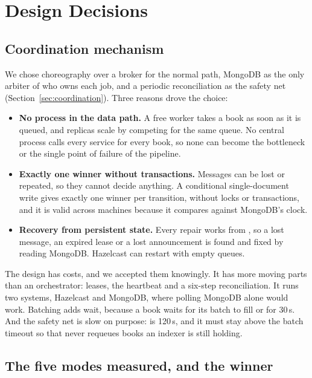 \section{Design Decisions}
\label{sec:decisions}

\subsection{Coordination mechanism}

We chose choreography over a broker for the normal path, MongoDB as the only arbiter of who owns each job, and a
periodic reconciliation as the safety net (Section~\ref{sec:coordination}). Three reasons drove the choice:
\begin{itemize}
\item \textbf{No process in the data path.} A free worker takes a book as soon as it is queued, and replicas scale by
  competing for the same queue. No central process calls every service for every book, so none can become the
  bottleneck or the single point of failure of the pipeline.
\item \textbf{Exactly one winner without transactions.} Messages can be lost or repeated, so they cannot decide
  anything. A conditional single-document write gives exactly one winner per transition, without locks or
  transactions, and it is valid across machines because it compares against MongoDB's clock.
\item \textbf{Recovery from persistent state.} Every repair works from , so a lost message, an expired
  lease or a lost announcement is found and fixed by reading MongoDB. Hazelcast can restart with empty queues.
\end{itemize}

The design has costs, and we accepted them knowingly. It has more moving parts than an orchestrator: leases, the
heartbeat and a six-step reconciliation. It runs two systems, Hazelcast and MongoDB, where polling MongoDB alone would
work. Batching adds wait, because a book waits for its batch to fill or for 30\,s. And the safety net is slow on
purpose:  is 120\,s, and it must stay above the batch timeout so that 
never requeues books an indexer is still holding.

\subsection{The five modes measured, and the winner}
\label{sec:winner}

